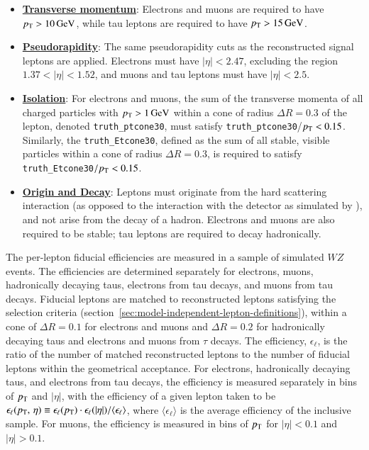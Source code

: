 \begin{itemize}
	\item \underline{\textbf{Transverse momentum}}: Electrons and muons are required to have $p_{\text{T}}>\SI{10}{\giga\electronvolt}$, while tau leptons are required to have $p_{\text{T}}>\SI{15}{\giga\electronvolt}$.
	\item \underline{\textbf{Pseudorapidity}}: The same pseudorapidity cuts as the reconstructed signal leptons are applied. Electrons must have $|\eta|<2.47$, excluding the region $1.37<|\eta|<1.52$, and muons and tau leptons must have $|\eta|<2.5$.
	\item \underline{\textbf{Isolation}}: For electrons and muons, the sum of the transverse momenta of all charged particles with $p_{\text{T}}>\SI{1}{\giga\electronvolt}$ within a cone of radius $\Delta R=0.3$ of the lepton, denoted \texttt{truth\_ptcone30}, must satisfy \texttt{truth\_ptcone30}/$p_{\text{T}}<0.15$. Similarly, the \texttt{truth\_Etcone30}, defined as the sum of all stable, visible particles within a cone of radius $\Delta R=0.3$, is required to satisfy \texttt{truth\_Etcone30}$/p_{\text{T}}<0.15$.
	\item \underline{\textbf{Origin and Decay}}: Leptons must originate from the hard scattering interaction (as opposed to the interaction with the detector as simulated by \geant), and not arise from the decay of a hadron. Electrons and muons are also required to be stable; tau leptons are required to decay hadronically. 
\end{itemize}

The per-lepton fiducial efficiencies are measured in a sample of simulated $WZ$ events. The efficiencies are determined separately for electrons, muons, hadronically decaying taus, electrons from tau decays, and muons from tau decays. Fiducial leptons are matched to reconstructed leptons satisfying the selection criteria (section~\ref{sec:model-independent-lepton-definitions}), within a cone of $\Delta R=0.1$ for electrons and muons and $\Delta R=0.2$ for hadronically decaying taus and electrons and muons from $\tau$ decays. The efficiency, $\epsilon_{\ell}$, is the ratio of the number of matched reconstructed leptons to the number of fiducial leptons within the geometrical acceptance. For electrons, hadronically decaying taus, and electrons from tau decays, the efficiency is measured separately in bins of $p_{\text{T}}$ and $|\eta|$, with the efficiency of a given lepton taken to be $\epsilon_{\ell}(\pt,\,\eta) \equiv \epsilon_{\ell}(\pt)\cdot\epsilon_{\ell}(|\eta|) / \langle \epsilon_{\ell} \rangle$, where $\langle \epsilon_{\ell} \rangle$ is the average efficiency of the inclusive sample. For muons, the efficiency is measured in bins of $p_{\text{T}}$ for $|\eta|<0.1$ and $|\eta|>0.1$. 

